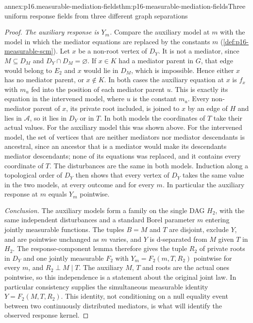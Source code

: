 \begin{annexitem}{annex:p16.measurable-mediation-fields}{thm:p16-measurable-mediation-fields}{Three uniform response fields from three different graph separations}
\begin{proof}
\emph{The auxiliary response is \(Y_m\).} Compare the auxiliary model
at \(m\) with the model in which the mediator equations are replaced
by the constants \(m\) (\cref{def:p16-measurable-scm}). Let \(x\) be
a non-root vertex of \(D_Y\). It is not a mediator, since
\(M\subseteq D_M\) and \(D_Y\cap D_M=\varnothing\). If \(x\in K\) had
a mediator parent in \(G\), that edge would belong to \(E_2\) and
\(x\) would lie in \(D_M\), which is impossible. Hence either \(x\)
has no mediator parent, or \(x\notin K\). In both cases the auxiliary
equation at \(x\) is \(f_x\) with \(m_u\) fed into the position of
each mediator parent \(u\). This is exactly its equation in the
intervened model, where \(u\) is the constant \(m_u\). Every
non-mediator parent of \(x\), its private root included, is joined to
\(x\) by an edge of \(H\) and lies in \(\mathcal A\), so it lies in
\(D_Y\) or in \(T\). In both models the coordinates of \(T\) take
their actual values. For the auxiliary model this was shown above. For
the intervened model, the set of vertices that are neither mediators
nor mediator descendants is ancestral, since an ancestor that is a
mediator would make its descendants mediator descendants; none of its
equations was replaced, and it contains every coordinate of \(T\).
The disturbances are the same in both models.
Induction along a topological order of \(D_Y\) then shows that every
vertex of \(D_Y\) takes the same value in the two models, at every
outcome and for every \(m\). In particular the auxiliary response at
\(m\) equals \(Y_m\) pointwise.

\emph{Conclusion.} The auxiliary models form a family on the single
DAG \(H_2\), with the same independent disturbances and a standard
Borel parameter \(m\) entering jointly measurable functions. The
tuples \(B=M\) and \(T\) are disjoint, exclude \(Y\), and are
pointwise unchanged as \(m\) varies, and \(Y\) is d-separated from
\(M\) given \(T\) in \(H_2\). The response-component lemma therefore
gives the tuple \(R_2\) of private roots in \(D_Y\) and one jointly
measurable \(F_2\) with \(Y_m=F_2(m,T,R_2)\) pointwise for every
\(m\), and \(R_2\perp M\mid T\). The auxiliary \(M\), \(T\) and roots
are the actual ones pointwise, so this independence is a statement
about the original joint law. In particular consistency supplies the
simultaneous measurable identity \(Y=F_2(M,T,R_2)\). This identity,
not conditioning on a null equality event between two continuously
distributed mediators, is what will identify the observed response
kernel.


\end{proof}
\end{annexitem}
